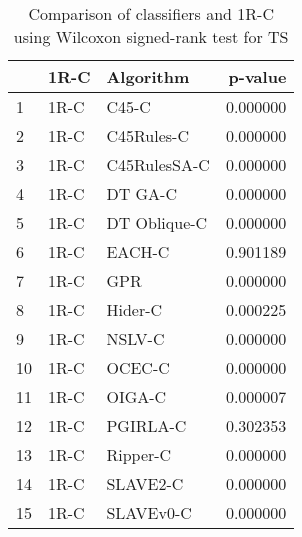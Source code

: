 \begin{table}
\footnotesize
\caption{Comparison of classifiers and 1R-C using Wilcoxon signed-rank test for TS}
\label{tab:1R-C wilcoxon TS comparison}
\begin{tabular}{lllr}
\hline
 & 1R-C & Algorithm & p-value \\
\hline
1 & 1R-C & C45-C & 0.000000 \\
2 & 1R-C & C45Rules-C & 0.000000 \\
3 & 1R-C & C45RulesSA-C & 0.000000 \\
4 & 1R-C & DT GA-C & 0.000000 \\
5 & 1R-C & DT Oblique-C & 0.000000 \\
6 & 1R-C & EACH-C & 0.901189 \\
7 & 1R-C & GPR & 0.000000 \\
8 & 1R-C & Hider-C & 0.000225 \\
9 & 1R-C & NSLV-C & 0.000000 \\
10 & 1R-C & OCEC-C & 0.000000 \\
11 & 1R-C & OIGA-C & 0.000007 \\
12 & 1R-C & PGIRLA-C & 0.302353 \\
13 & 1R-C & Ripper-C & 0.000000 \\
14 & 1R-C & SLAVE2-C & 0.000000 \\
15 & 1R-C & SLAVEv0-C & 0.000000 \\
\hline
\end{tabular}
\end{table}
